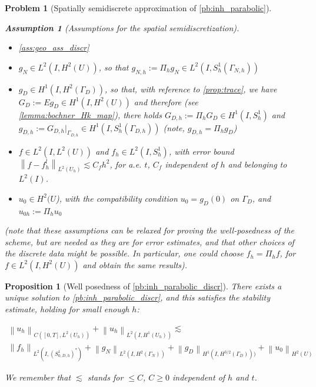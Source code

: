 \documentclass[english,a4paper,9pt,oneside]{scrbook}	%
\theoremstyle{break}
\newtheorem{prop}[equation]{Proposition}
\newtheorem{ass}[equation]{Assumption}
\newtheorem{pb}[equation]{Problem}
\theoremstyle{remark}
\newcommand{\norm}[1]{\left\lVert#1\right\rVert}
\begin{document}
\begin{appendices}
\begin{pb}[Spatially semidiscrete approximation of \cref{pb:inh_parabolic}]
\begin{ass}[Assumptions for the spatial semidiscretization]
\label{ass:discr_reg}
\textcolor{white}{ }
\begin{itemize}
	\item \cref{ass:geo_ass_discr}
	\item $g_N \in L^2(I,H^2(U))$, so that $g_{N,h}:=\Pi_h g_N \in L^2(I, S^1_h(\Gamma_{N,h}))$
	\item $g_D \in H^1(I, H^{2}(\Gamma_D))$, so that, with reference to \cref{prop:trace}, we have $G_D:=Eg_D \in H^1(I,H^2(U))$ and therefore (see \cref{lemma:bochner_Hk_map}), there holds $G_{D,h}:=\Pi_h G_D \in H^1(I, S^1_h)$ and $g_{D,h}:=G_{D,h}|_{\Gamma_{D,h}} \in H^1(I, S^1_h(\Gamma_{D,h}))$ (note, $g_{D,h} = \Pi_h g_D$)
	\item $f \in L^2(I,L^2(U))$ and $f_h \in L^2(I, S^1_h)$, with error bound  $\norm{f-f_h^l}_{L^2(U_h)}\lesssim C_f h^2$, for a.e. $t$, $C_f$ independent of $h$ and belonging to $L^2(I)$.
	\item $u_0\in H^2(U$), with the compatibility condition $u_{0} = g_{D}(0)$ on $\Gamma_{D}$, and $u_{0h}:=\Pi_h u_0$
\end{itemize}

(note that these assumptions can be relaxed for proving the well-posedness of the scheme, but are needed as they are for error estimates, and that other choices of the discrete data might be possible. In particular, one could choose $f_h=\Pi_h f$, for $f\in L^2(I, H^2(U))$ and obtain the same results).

\end{ass}

\end{pb}

\begin{prop}[Well posedness of \cref{pb:inh_parabolic_discr}]
\label{prop:wp_discr_par}
There exists a unique solution to \cref{pb:inh_parabolic_discr}, and this satisfies the stability estimate, holding for small enough $h$:

\begin{align*}
	\norm{u_h}_{C([0,T],L^2(U_h))} + \norm{u_h}_{L^2(I,H^1(U_h))}\lesssim \\\norm{f_h}_{L^2(I,(S^1_{0,D,h})^*)}  + \norm{g_{N}}_{L^2(I,H^2(\Gamma_{N}))} + \norm{g_D}_{H^1(I,H^{3/2}(\Gamma_D)))} + \norm{u_{0}}_{H^2(U)}
\end{align*}

We remember that $\lesssim$ stands for $\leq C$, $C\geq 0$ independent of $h$ and $t$.


\end{prop}
\end{appendices}
\end{document}
